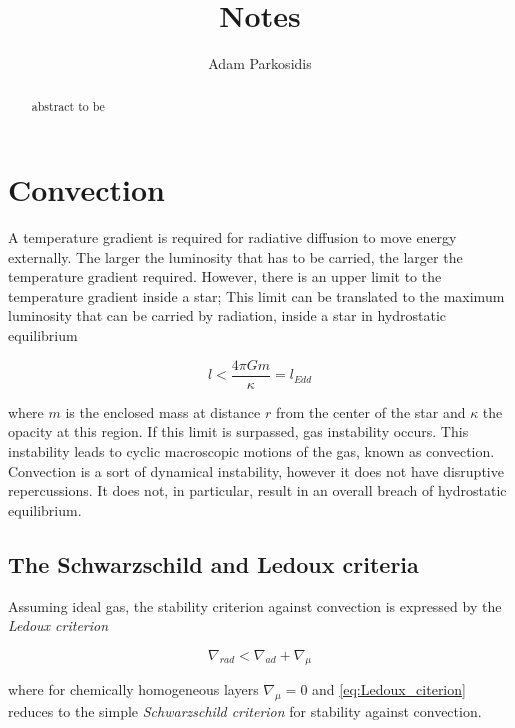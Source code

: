 \documentclass[aps,prb,twocolumn,superscriptaddress,floatfix,longbibliography]{revtex4-2}
\newcommand{\mytitle}{Notes}
\begin{document}
\title{\mytitle}

\author{Adam Parkosidis}

\begin{abstract}
abstract to be
\end{abstract}
\maketitle

\section{Convection}

A temperature gradient is required for radiative diffusion to move energy externally. The larger the luminosity that has to be carried, the larger the temperature gradient required. However, there is an upper limit to the temperature gradient inside a star; This limit can be translated to the maximum luminosity that can be carried by radiation, inside a star in hydrostatic equilibrium

\begin{equation}\label{eq:eddington_luminosity}
    l < \frac{4 \pi G m}{\kappa} = l_{Edd}
\end{equation}

where $m$ is the enclosed mass at distance $r$ from the center of the star and $\kappa$ the opacity at this region. If this limit is surpassed, gas instability occurs.  This instability leads to cyclic macroscopic motions of the gas, known as convection. Convection is a sort of dynamical instability, however it does not have disruptive repercussions. It does not, in particular, result in an overall breach of hydrostatic equilibrium.


\subsection{The Schwarzschild and Ledoux criteria}

Assuming ideal gas, the stability criterion against convection is expressed by the {\it Ledoux criterion}

\begin{equation}\label{eq:Ledoux_citerion}
    \nabla_{rad} < \nabla_{ad} + \nabla_{\mu}
\end{equation}

where for chemically homogeneous layers $\nabla_{\mu} = 0$ and \eqref{eq:Ledoux_citerion} reduces to the simple {\it Schwarzschild criterion} for stability against convection.
\end{document}
